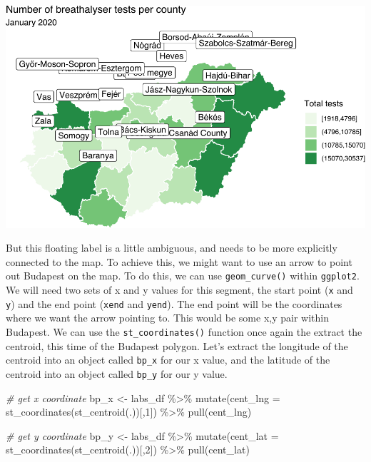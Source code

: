 \documentclass[
]{book}
\newenvironment{Shaded}{\begin{snugshade}}{\end{snugshade}}
\newcommand{\AttributeTok}[1]{\textcolor[rgb]{0.77,0.63,0.00}{#1}}
\newcommand{\CommentTok}[1]{\textcolor[rgb]{0.56,0.35,0.01}{\textit{#1}}}
\newcommand{\DecValTok}[1]{\textcolor[rgb]{0.00,0.00,0.81}{#1}}
\newcommand{\FunctionTok}[1]{\textcolor[rgb]{0.00,0.00,0.00}{#1}}
\newcommand{\NormalTok}[1]{#1}
\newcommand{\OtherTok}[1]{\textcolor[rgb]{0.56,0.35,0.01}{#1}}
\newcommand{\SpecialCharTok}[1]{\textcolor[rgb]{0.00,0.00,0.00}{#1}}
\begin{document}
\includegraphics{crime_mapping_files/figure-latex/addcountynamesBPonly-1.pdf}

But this floating label is a little ambiguous, and needs to be more explicitly connected to the map. To achieve this, we might want to use an arrow to point out Budapest on the map. To do this, we can use \texttt{geom\_curve()} within \texttt{ggplot2}. We will need two sets of x and y values for this segment, the start point (\texttt{x} and \texttt{y}) and the end point (\texttt{xend} and \texttt{yend}). The end point will be the coordinates where we want the arrow pointing to. This would be some x,y pair within Budapest. We can use the \texttt{st\_coordinates()} function once again the extract the centroid, this time of the Budapest polygon. Let's extract the longitude of the centroid into an object called \texttt{bp\_x} for our x value, and the latitude of the centroid into an object called \texttt{bp\_y} for our y value.

\begin{Shaded}
\begin{Highlighting}[]
\CommentTok{\# get x coordinate}
\NormalTok{bp\_x }\OtherTok{\textless{}{-}}\NormalTok{ labs\_df }\SpecialCharTok{\%\textgreater{}\%} 
  \FunctionTok{mutate}\NormalTok{(}\AttributeTok{cent\_lng =} \FunctionTok{st\_coordinates}\NormalTok{(}\FunctionTok{st\_centroid}\NormalTok{(.))[,}\DecValTok{1}\NormalTok{]) }\SpecialCharTok{\%\textgreater{}\%} 
  \FunctionTok{pull}\NormalTok{(cent\_lng)}

\CommentTok{\# get y coordinate}
\NormalTok{bp\_y }\OtherTok{\textless{}{-}}\NormalTok{ labs\_df }\SpecialCharTok{\%\textgreater{}\%} 
  \FunctionTok{mutate}\NormalTok{(}\AttributeTok{cent\_lat =} \FunctionTok{st\_coordinates}\NormalTok{(}\FunctionTok{st\_centroid}\NormalTok{(.))[,}\DecValTok{2}\NormalTok{]) }\SpecialCharTok{\%\textgreater{}\%} 
  \FunctionTok{pull}\NormalTok{(cent\_lat)}
\end{Highlighting}
\end{Shaded}
\end{document}
